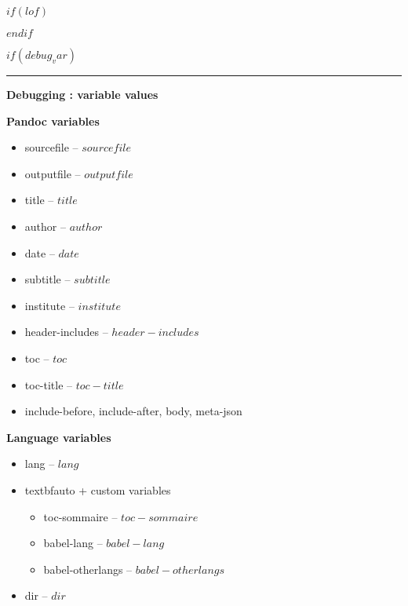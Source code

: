 \documentclass[$if(fontsize)$$fontsize$,$endif$$if(lang)$$babel-lang$,$endif$$if(papersize)$$papersize$paper,$endif$$for(classoption)$$classoption$$sep$,$endfor$]{$documentclass$}
\begin{document}
$if(lof)$
\listoffigures
$endif$



$if(debug_var)$

\begin{centering}
\rule{2in}{0.4pt} 

\Large{\textbf{Debugging : variable values}}

\end{centering}


\textbf{Pandoc variables}

\begin{itemize}
        \item sourcefile -- $sourcefile$
        \item outputfile -- $outputfile$
        \item title -- $title$
        \item author -- $author$ %
        \item date -- $date$
        \item subtitle -- $subtitle$
        \item institute -- $institute$
        \item header-includes -- $header-includes$
        \item toc -- $toc$
        \item toc-title -- $toc-title$ %
        \item include-before, include-after, body, meta-json
\end{itemize}


\textbf{Language variables}
\begin{itemize}
        \item lang -- $lang$
        \item textbf{auto + custom variables}
        \begin{itemize}
                \item toc-sommaire -- $toc-sommaire$
                \item babel-lang -- $babel-lang$
                \item babel-otherlangs -- $babel-otherlangs$
        \end{itemize}
        \item dir -- $dir$ %
\end{itemize}
\end{document}

